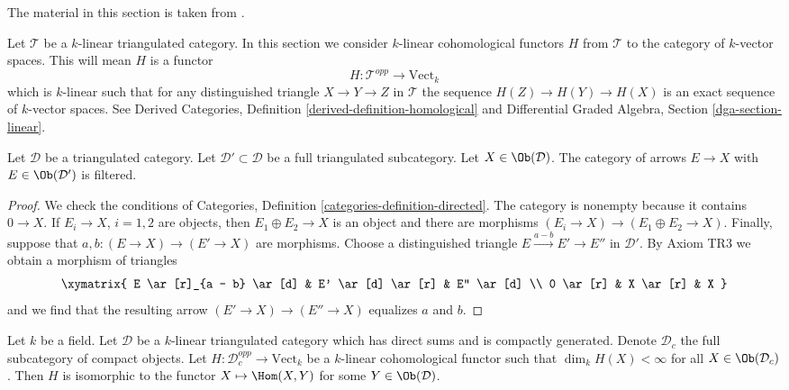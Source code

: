 \noindent
The material in this section is taken from \cite{BvdB}.

\medskip\noindent
Let $\mathcal{T}$ be a $k$-linear triangulated category.
In this section we consider $k$-linear cohomological functors
$H$ from $\mathcal{T}$ to the category of $k$-vector spaces.
This will mean $H$ is a functor
$$
H : \mathcal{T}^{opp} \longrightarrow \text{Vect}_k
$$
which is $k$-linear such that for any distinguished triangle
$X \to Y \to Z$ in $\mathcal{T}$ the sequence $H(Z) \to H(Y) \to H(X)$
is an exact sequence of $k$-vector spaces. See
Derived Categories, Definition \ref{derived-definition-homological}
and Differential Graded Algebra, Section \ref{dga-section-linear}.

\begin{lemma}
\label{lemma-maps-from-compact-filtered}
Let $\mathcal{D}$ be a triangulated category. Let
$\mathcal{D}' \subset \mathcal{D}$ be a full triangulated subcategory. Let
$X \in \Ob(\mathcal{D})$. The category of arrows $E \to X$ with
$E \in \Ob(\mathcal{D}')$ is filtered.
\end{lemma}

\begin{proof}
We check the conditions of
Categories, Definition \ref{categories-definition-directed}.
The category is nonempty because it contains $0 \to X$.
If $E_i \to X$, $i = 1, 2$ are objects, then $E_1 \oplus E_2 \to X$
is an object and there are morphisms $(E_i \to X) \to (E_1 \oplus E_2 \to X)$.
Finally, suppose that $a, b : (E \to X) \to (E' \to X)$ are morphisms.
Choose a distinguished triangle $E \xrightarrow{a - b} E' \to E''$
in $\mathcal{D}'$. By Axiom TR3 we obtain a morphism of triangles
$$
\xymatrix{
E \ar[r]_{a - b} \ar[d] &
E' \ar[d] \ar[r] & E'' \ar[d] \\
0 \ar[r] &
X \ar[r] &
X
}
$$
and we find that the resulting arrow $(E' \to X) \to (E'' \to X)$
equalizes $a$ and $b$.
\end{proof}

\begin{lemma}
\label{lemma-van-den-bergh}
\begin{reference}
\cite[Lemma 2.14]{CKN}
\end{reference}
Let $k$ be a field. Let $\mathcal{D}$ be a $k$-linear triangulated category
which has direct sums and is compactly generated.
Denote $\mathcal{D}_c$ the full
subcategory of compact objects. Let $H : \mathcal{D}_c^{opp} \to \text{Vect}_k$
be a $k$-linear cohomological functor such that
$\dim_k H(X) < \infty$ for all $X \in \Ob(\mathcal{D}_c)$.
Then $H$ is isomorphic to the functor $X \mapsto \Hom(X, Y)$
for some $Y \in \Ob(\mathcal{D})$.
\end{lemma}

